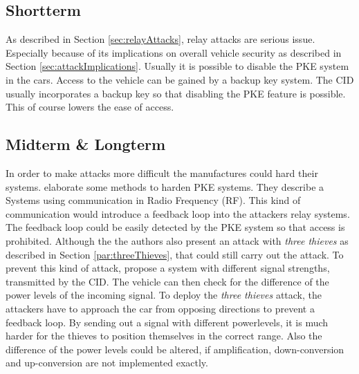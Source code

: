
\subsection{Shortterm}
	As described in Section \ref{sec:relayAttacks}, relay attacks are serious issue.
	Especially because of its implications on overall vehicle security as described in Section \ref{sec:attackImplications}.
	Usually it is possible to disable the PKE system in the cars.
	Access to the vehicle can be gained by a backup key system.
	The CID usually incorporates a backup key so that disabling the PKE feature is possible.
	This of course lowers the ease of access.

\subsection{Midterm \& Longterm}
	In order to make attacks more difficult the manufactures could hard their systems.
	\citeauthor{someAttacksPKES} elaborate some methods to harden PKE systems.
	They describe a Systems using communication in Radio Frequency (RF).
	This kind of communication would introduce a feedback loop into the attackers relay systems.
	The feedback loop could be easily detected by the PKE system so that access is prohibited.
	Although the the authors also present an attack with \textsl{three thieves}
	as described in Section \ref{par:threeThieves}, that could still
	carry out the attack.
	To prevent this kind of attack,
	\citeauthor{someAttacksPKES} propose a system with different signal strengths,
	transmitted by the CID.
	The vehicle can then check for the difference of the power levels of the incoming signal.
	To deploy the \textsl{three thieves} attack,
	the attackers have to approach the car from opposing directions to prevent a feedback loop.
	By sending out a signal with different powerlevels,
	it is much harder for the thieves to position themselves in the correct range.
	Also the difference of the power levels could be altered,
	if amplification, down-conversion and up-conversion are not implemented exactly.

